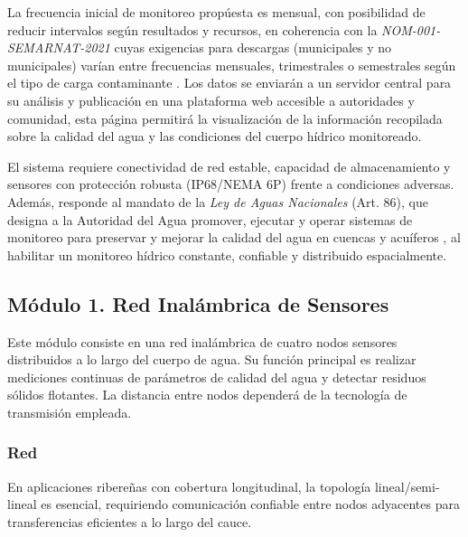 La frecuencia inicial de monitoreo propúesta es mensual, con posibilidad de reducir intervalos según resultados y recursos, en coherencia con la \textit{NOM-001-SEMARNAT-2021} cuyas exigencias para descargas (municipales y no municipales) varían entre frecuencias mensuales, trimestrales o semestrales según el tipo de carga contaminante \cite{nom001}. Los datos se enviarán a un servidor central para su análisis y publicación en una plataforma web accesible a autoridades y comunidad, esta página permitirá la visualización de la información recopilada sobre la calidad del agua y las condiciones del cuerpo hídrico monitoreado.  

El sistema requiere conectividad de red estable, capacidad de almacenamiento y sensores con protección robusta (IP68/NEMA 6P) frente a condiciones adversas. Además, responde al mandato de la \textit{Ley de Aguas Nacionales} (Art. 86), que designa a la Autoridad del Agua promover, ejecutar y operar sistemas de monitoreo para preservar y mejorar la calidad del agua en cuencas y acuíferos \cite{LAN2024}, al habilitar un monitoreo hídrico constante, confiable y distribuido espacialmente.


\subsection{Módulo 1. Red Inalámbrica de Sensores}
Este módulo consiste en una red inalámbrica de cuatro nodos sensores distribuidos a lo largo del cuerpo de agua. Su función principal es realizar mediciones continuas de parámetros de calidad del agua y detectar residuos sólidos flotantes. La distancia entre nodos dependerá de la tecnología de transmisión empleada.

\subsubsection*{Red}
En aplicaciones ribereñas con cobertura longitudinal, la topología lineal/semi-lineal es esencial, requiriendo comunicación confiable entre nodos adyacentes para transferencias eficientes a lo largo del cauce.

